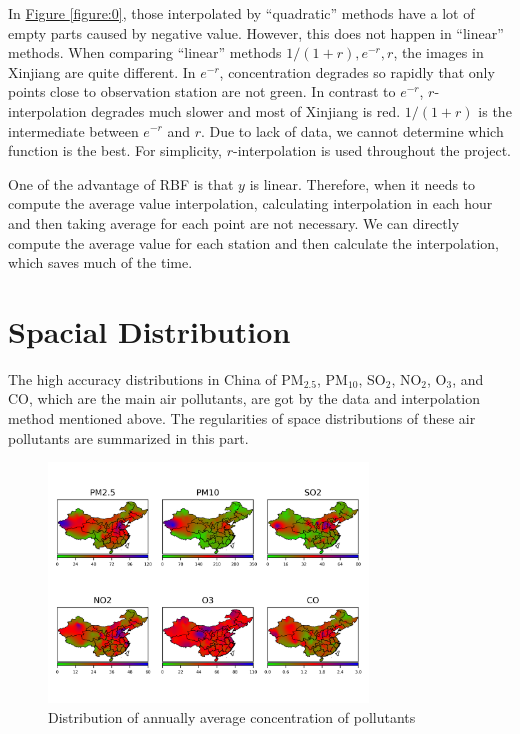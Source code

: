 \documentclass[letterpaper]{article}
\begin{document}
\begin{CJK*}{UTF8}{gkai}
In \hyperref[figure:0]{Figure \ref*{figure:0}}, those interpolated by ``quadratic'' methods have a lot of empty parts caused by negative value. However, this does not happen in ``linear'' methods. When comparing ``linear'' methods $1/(1+r), e^{-r}, r$, the images in Xinjiang are quite different. In $e^{-r}$, concentration degrades so rapidly that only points close to observation station are not green. In contrast to $e^{-r}$, $r$-interpolation degrades much slower and most of Xinjiang is red. $1/(1+r)$ is the intermediate between $e^{-r}$ and $r$. Due to lack of data, we cannot determine which function is the best. For simplicity, $r$-interpolation is used throughout the project.

 One of the advantage of RBF is that $y$ is linear. Therefore, when it needs to compute the average value interpolation, calculating interpolation in each hour and then taking average for each point are not necessary. We can directly compute the average value for each station and then calculate the interpolation, which saves much of the time.

\section{Spacial Distribution}

The high accuracy distributions in China of PM$_{2.5}$, PM$_{10}$, SO$_{2}$, NO$_{2}$, O$_{3}$, and CO, which are the main air pollutants, are got by the data and interpolation method mentioned above. The regularities of space distributions of these air pollutants are summarized in this part.
\begin{figure}[h]
  \includegraphics[width = 8.5cm]{Interpolation_from_20150102_to_20151231_linear.png}
  \caption{Distribution of annually average concentration of pollutants}
  \label{figure:1}
  \centering
\end{figure}


\end{CJK*}
\end{document}
